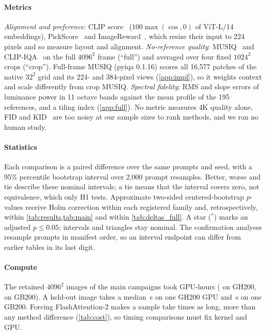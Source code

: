 \paragraph{Metrics}
\emph{Alignment and preference}: CLIP score~\citep{radford2021clip,hessel2021clipscore} ($100\max(\cos,0)$ of ViT-L/14 embeddings), PickScore~\citep{kirstain2023pickapic} and ImageReward~\citep{xu2023imagereward}, which resize their input to 224 pixels and so measure layout and alignment. \emph{No-reference quality}: MUSIQ~\citep{ke2021musiq} and CLIP-IQA~\citep{wang2023clipiqa} on the full $4096^2$ frame (``full'') and averaged over four fixed $1024^2$ crops (``crop''). Full-frame MUSIQ (pyiqa 0.1.16) scores all 16,577 patches of the native $32^2$ grid and its 224- and 384-pixel views (\cref{app:impl}), so it weights context and scale differently from crop MUSIQ. \emph{Spectral fidelity}: RMS and slope errors of luminance power in 11 octave bands against the mean profile of the 195 \afk{} references, and a tiling index (\cref{app:full}). No metric measures 4K quality alone, FID and KID~\citep{heusel2017fid,binkowski2018kid} are too noisy at our sample sizes to rank methods, and we ran no human study.

\paragraph{Statistics}
Each comparison is a paired difference over the same prompts and seed, with a 95\% percentile bootstrap interval over 2,000 prompt resamples. Better, worse and tie describe these nominal intervals; a tie means that the interval covers zero, not equivalence, which only H1 tests. Approximate two-sided centered-bootstrap $p$-values receive Holm correction within each registered family and, retrospectively, within \cref{tab:results,tab:main} and within \cref{tab:deltas_full}. A star ($^{*}$) marks an adjusted $p\le0.05$; intervals and triangles stay nominal. The confirmation analyses resample prompts in manifest order, so an interval endpoint can differ from earlier tables in its last digit.

\paragraph{Compute}
The \NcompNimgs{} retained $4096^2$ images of the main campaigns took \NcompGPUhours{} GPU-hours (\NcompGPUhoursGH{} on GH200, \NcompGPUhoursBW{} on GB200). A held-out image takes a median \NcompGHcudnnSec\,s on one GH200 GPU and \NcompBWSec\,s on one GB200. Forcing FlashAttention-2 makes a sample take \NcompFlashRatio{} times as long, more than any method difference (\cref{tab:cost}), so timing comparisons must fix kernel and GPU.
